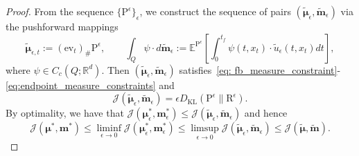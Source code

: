 \documentclass{amsart}
\numberwithin{equation}{section}
\newcommand{\R}{\mathbb{R}}
\newcommand{\kecmt}[1]{{\color{blue} #1}}
\begin{document}
\begin{proof}
From the sequence $\{\mathrm{P}^\epsilon\}_\epsilon$, we construct the sequence of pairs %
$(\tilde{\boldsymbol{\mu}}_\epsilon, \tilde{\mathbf{m}}_\epsilon)$ via the pushforward mappings%
\begin{equation}
    \label{eq:eulerian_from_path}
    \tilde{\boldsymbol{\mu}}_{\epsilon,t} := (\mathrm{ev}_t)_\# \mathrm{P}^\epsilon, \qquad \int_Q \psi \cdot d\tilde{\mathbf{m}}_\epsilon := \mathbb{E}^{\mathrm{P}^\epsilon}\left[ \int_0^{t_f} \psi(t, x_t) \cdot \tilde{u}_\epsilon(t, x_t) dt \right],
\end{equation}
where $\psi\in C_c(Q;\R^d)$. Then $(\tilde{\boldsymbol{\mu}}_\epsilon, \tilde{\mathbf{m}}_\epsilon)$ satisfies~\eqref{eq: fb_measure_constraint}-\eqref{eq:endpoint_measure_constraints} and %
\[
\mathcal{J}(\tilde{\boldsymbol{\mu}}_\epsilon, \tilde{\mathbf{m}}_\epsilon) = \epsilon D_{\mathrm{KL}}(\mathrm{P}^\epsilon \| \mathrm{R}^\epsilon).
\]
By optimality, we have that $\mathcal{J}(\boldsymbol{\mu}_\epsilon^*, \mathbf{m}_\epsilon^*)\leq \mathcal{J}(\tilde{\boldsymbol{\mu}}_\epsilon, \tilde{\mathbf{m}}_\epsilon)$ and hence
\begin{equation}
    \mathcal{J}(\boldsymbol{\mu}^*, \mathbf{m}^*) \leq \liminf_{\epsilon \to 0} \mathcal{J}(\boldsymbol{\mu}_\epsilon^*, \mathbf{m}_\epsilon^*) \leq \limsup_{\epsilon \to 0} \mathcal{J}(\tilde{\boldsymbol{\mu}}_\epsilon, \tilde{\mathbf{m}}_\epsilon) \leq \mathcal{J}(\tilde{\boldsymbol{\mu}}, \tilde{\mathbf{m}}).
\end{equation}
\end{proof}
\end{document}
